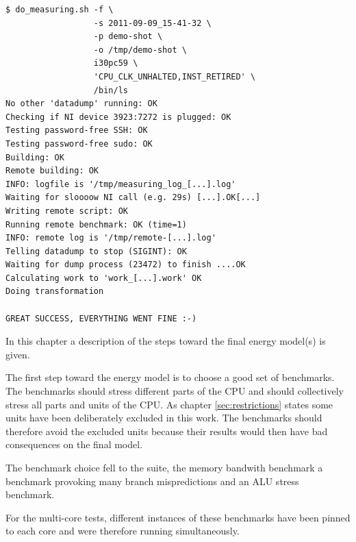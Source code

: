 \begin{lstlisting}[style=Shell]
$ do_measuring.sh -f \
                  -s 2011-09-09_15-41-32 \
                  -p demo-shot \
                  -o /tmp/demo-shot \
                  i30pc59 \
                  'CPU_CLK_UNHALTED,INST_RETIRED' \
                  /bin/ls
No other 'datadump' running: OK
Checking if NI device 3923:7272 is plugged: OK
Testing password-free SSH: OK
Testing password-free sudo: OK
Building: OK
Remote building: OK
INFO: logfile is '/tmp/measuring_log_[...].log'
Waiting for sloooow NI call (e.g. 29s) [...].OK[...]
Writing remote script: OK
Running remote benchmark: OK (time=1)
INFO: remote log is '/tmp/remote-[...].log'
Telling datadump to stop (SIGINT): OK
Waiting for dump process (23472) to finish ....OK
Calculating work to 'work_[...].work' OK
Doing transformation

GREAT SUCCESS, EVERYTHING WENT FINE :-)
\end{lstlisting}




\label{sec:towards-the-model}

In this chapter a description of the steps toward the final energy model(s) is
given.


\label{sec:benchmarks}

The first step toward the energy model is to choose a good set of benchmarks.
The benchmarks should stress different parts of the CPU and should collectively
stress all parts and units of the CPU. As chapter \ref{sec:restrictions} states
some units have been deliberately excluded in this work. The benchmarks should
therefore avoid the excluded units because their results would then have bad
consequences on the final model.

The benchmark choice fell to the \JWTLspec{} suite, the memory bandwith
benchmark \JWTLstream{} a benchmark provoking many branch mispredictions
and an ALU stress benchmark.

For the multi-core tests, different instances of these benchmarks have been
pinned to each core and were therefore running simultaneously.


\label{sec:finding-useful-subset}

